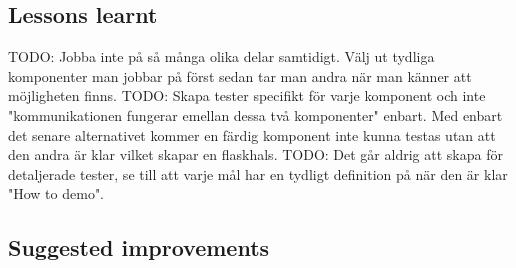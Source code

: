 \subsection{Lessons learnt}
TODO: Jobba inte på så många olika delar samtidigt. Välj ut tydliga komponenter man jobbar på först sedan tar man andra när man känner att möjligheten finns.
TODO: Skapa tester specifikt för varje komponent och inte "kommunikationen fungerar emellan dessa två komponenter" enbart. Med enbart det senare alternativet kommer en färdig komponent inte kunna testas utan att den andra är klar vilket skapar en flaskhals.
TODO: Det går aldrig att skapa för detaljerade tester, se till att varje mål har en tydligt definition på när den är klar "How to demo".
\subsection{Suggested improvements}

